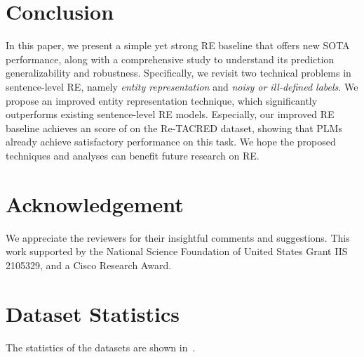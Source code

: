 \documentclass[11pt,a4paper]{article}
\begin{document}
\section{Conclusion}
In this paper, we present a simple yet strong RE baseline that offers new SOTA performance, along with a comprehensive study to understand its prediction generalizability and robustness.
Specifically, we revisit two technical problems in sentence-level RE, namely \emph{entity representation} and \emph{noisy or ill-defined labels}.
We propose an improved entity representation technique, which significantly outperforms existing sentence-level RE models.
Especially, our improved RE baseline achieves an  score of  on the Re-TACRED dataset, showing that PLMs already achieve satisfactory performance on this task.
We hope the proposed techniques and analyses can benefit future research on RE.




\section*{Acknowledgement}


We appreciate the reviewers for their insightful comments and suggestions.
This work supported by the National Science Foundation of United States Grant IIS 2105329, and a Cisco Research Award.






\clearpage
\appendix

\section{Dataset Statistics}
\label{ssec:data_statistics}
\begin{table}[!h]
    \centering
    \caption{Statistics of datasets.}
    \label{tab:data_statistics}
\end{table}
The statistics of the datasets are shown in~.
\end{document}
